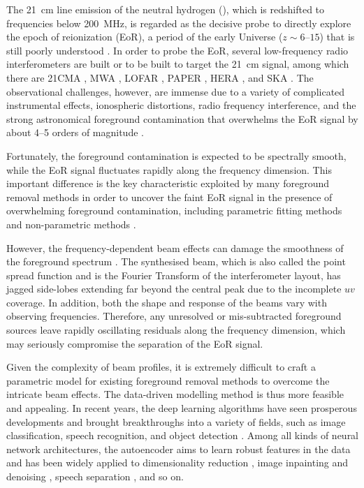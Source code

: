 \documentclass[letters,a4paper,fleqn,usenatbib]{mnras}
\begin{document}
The \SI{21}{\cm} line emission of the neutral hydrogen (\Hi), which is
redshifted to frequencies below \SI{200}{\MHz}, is regarded as the
decisive probe to directly explore the epoch of reionization (EoR),
a period of the early Universe ($z \sim \numrange{6}{15}$) that is
still poorly understood
\citep[see][for reviews]{furlanetto2006rev,furlanetto2016rev}.
In order to probe the EoR, several low-frequency radio interferometers
are built or to be built to target the \SI{21}{\cm} signal, among which
there are 21CMA \citep{zheng2016}, MWA \citep{tingay2013},
LOFAR \citep{vanHaarlem2013}, PAPER \citep{parsons2010},
HERA \citep{deboer2017}, and SKA \citep{koopmans2015rev}.
The observational challenges, however, are immense due to a variety of
complicated instrumental effects, ionospheric distortions, radio frequency
interference, and the strong astronomical foreground contamination that
overwhelms the EoR signal by about \numrange{4}{5} orders of magnitude
\citep[see][for a review]{morales2010rev}.

Fortunately, the foreground contamination is expected to be
spectrally smooth, while the EoR signal fluctuates rapidly along the
frequency dimension.
This important difference is the key characteristic exploited by many
foreground removal methods in order to uncover the faint EoR signal in
the presence of overwhelming foreground contamination, including
parametric fitting methods \citep[e.g.,][]{wang2006,liu2009fgrm,wang2013}
and non-parametric methods \citep[e.g.,][]{harker2009,chapman2013,mertens2018}.

However, the frequency-dependent beam effects can damage the smoothness
of the foreground spectrum \citep{liu2009ps}.
The synthesised beam, which is also called the point spread function
and is the Fourier Transform of the interferometer layout, has jagged
side-lobes extending far beyond the central peak due to the incomplete
$uv$ coverage.
In addition, both the shape and response of the beams vary with
observing frequencies.
Therefore, any unresolved or mis-subtracted foreground sources leave
rapidly oscillating residuals along the frequency dimension, which may
seriously compromise the separation of the EoR signal.

Given the complexity of beam profiles, it is extremely difficult to
craft a parametric model for existing foreground removal methods to
overcome the intricate beam effects.
The data-driven modelling method is thus more feasible and appealing.
In recent years, the deep learning algorithms have seen prosperous
developments and brought breakthroughs into a variety of fields, such
as image classification, speech recognition, and object detection
\citep{lecun2015}.
Among all kinds of neural network architectures, the autoencoder
aims to learn robust features in the data \citep{vincent2008}
and has been widely applied to
dimensionality reduction \citep{hinton2006},
image inpainting and denoising \citep{suganuma2018},
speech separation \citep{grais2017}, and so on.
\end{document}
